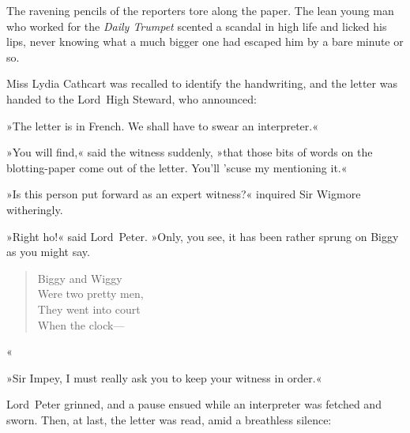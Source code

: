The ravening pencils of the reporters tore along the paper. The lean
young man who worked for the \textit{Daily Trumpet} scented a scandal in high
life and licked his lips, never knowing what a much bigger one had
escaped him by a bare minute or so.

Miss Lydia Cathcart was recalled to identify the handwriting, and the
letter was handed to the Lord~High Steward, who announced:

»The letter is in French. We shall have to swear an interpreter.«

»You will find,« said the witness suddenly, »that those bits of
words on the blotting-paper come out of the letter. You'll 'scuse my
mentioning it.«

»Is this person put forward as an expert witness?« inquired Sir Wigmore
witheringly.

»Right ho!« said Lord~Peter. »Only, you see, it has been rather sprung
on Biggy as you might say.

\begin{verse}
Biggy and Wiggy\\
Were two pretty men,\\
They went into court\\
When the clock—\end{verse}«

»Sir Impey, I must really ask you to keep your witness in order.«

Lord~Peter grinned, and a pause ensued while an interpreter was fetched
and sworn. Then, at last, the letter was read, amid a breathless
silence:

